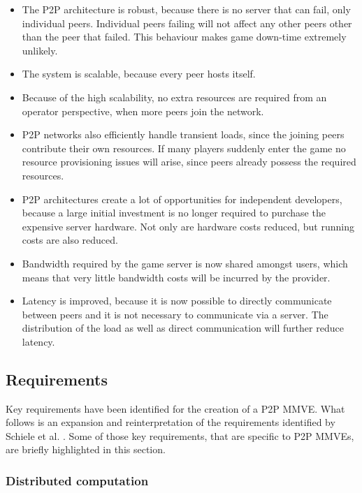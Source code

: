 \begin{itemize}
\item The P2P architecture is robust, because there is no server that can fail, only individual peers. Individual peers failing will not affect any other peers other than the peer that failed. This behaviour makes game down-time extremely unlikely.

\item The system is scalable, because every peer hosts itself.

\item Because of the high scalability, no extra resources are required from an operator perspective, when more peers join the network.

\item P2P networks also efficiently handle transient loads, since the joining peers contribute their own resources. If many players suddenly enter the
game no resource provisioning issues will arise, since peers already possess the required resources.

\item P2P architectures create a lot of opportunities for independent developers, because a large initial investment is no longer required to purchase
the expensive server hardware. Not only are hardware costs reduced, but running costs are also reduced.

\item Bandwidth required by the game server is now shared amongst users, which means that very little bandwidth costs will be incurred by the provider.

\item Latency is improved, because it is now possible to directly communicate between peers and it is not necessary to communicate via a server.
The distribution of the load as well as direct communication will further reduce latency.
\end{itemize}

\subsection{Requirements}

Key requirements have been identified for the creation of a P2P MMVE. What follows is an expansion and reinterpretation of the requirements identified by Schiele et al. \cite{Schiele_p2p_requirements}. Some of those key requirements, that are specific to P2P MMVEs, are briefly highlighted in this section.

\subsubsection{Distributed computation}
\label{distributed_computation_requirement}


